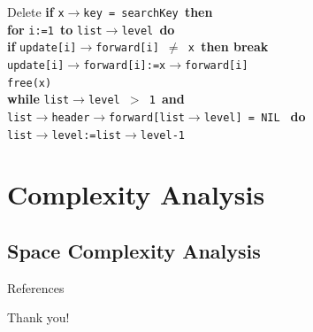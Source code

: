\documentclass[12pt]{beamer}
\begin{document}
\begin{frame}{Delete }
\quad\textbf{if }\texttt{x$\rightarrow$key = searchKey }\textbf{then} \\
\quad\quad\textbf{for }\texttt{i:=1 }\textbf{to } \texttt{list$\rightarrow$level }\textbf{do} \\
\quad\quad\quad\textbf{if }\texttt{update[i]$\rightarrow$forward[i] $\neq$ x }\textbf{then break}  \\
\quad\quad\quad\texttt{update[i]$\rightarrow$forward[i]:=x$\rightarrow$forward[i]} \\
\quad\quad\texttt{free(x)} \\
\quad\quad\textbf{while }\texttt{list$\rightarrow$level $>$ 1 }\textbf{and} \\
\quad\quad\quad \texttt{list$\rightarrow$header$\rightarrow$forward[list$\rightarrow$level] = NIL } \textbf{do} \\
\quad\quad\quad \texttt{list$\rightarrow$level:=list$\rightarrow$level-1}
\end{frame}
\section{Complexity Analysis}
\subsection{Space Complexity Analysis}
\begin{frame}{References}
	
\end{frame}
\begin{frame}[standout]
Thank you! 
\end{frame}
\end{document}
